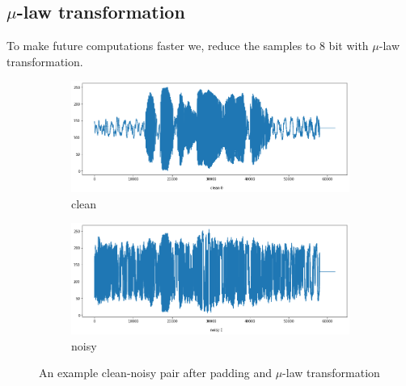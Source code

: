 \documentclass{article}
\begin{document}
	\subsection{\boldmath$\mu$-law transformation}
	To make future computations faster we, reduce the samples to 8 bit with $\mu$-law transformation.
	
	\begin{figure}[H]
		\centering
		\begin{subfigure}{.5\textwidth}
			\centering
			\includegraphics[width=.8\linewidth]{wave_clean_padded_mulaw}
			\caption{clean}
			\label{fig:wave_clean_padded_mulaw}
		\end{subfigure}%
		\begin{subfigure}{.5\textwidth}
			\centering
			\includegraphics[width=.8\linewidth]{wave_noisy_padded_mulaw}
			\caption{noisy}
			\label{fig:wave_noisy_padded_mulaw}
		\end{subfigure}
		\caption{An example clean-noisy pair after padding and $\mu$-law transformation}
		\label{fig:test}
	\end{figure}


	
	\newpage
	\printbibliography

	
\end{document}
